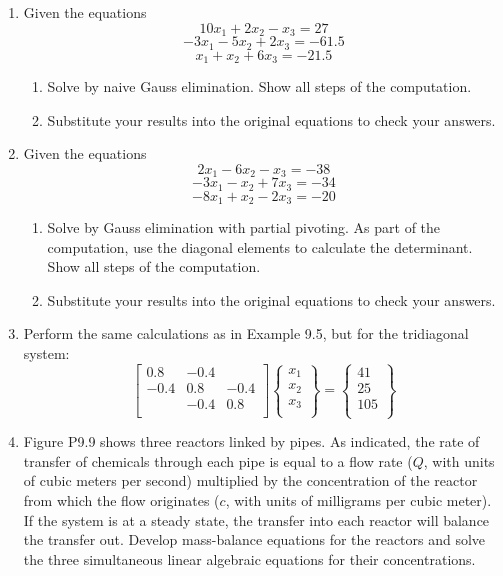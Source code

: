 \documentclass[../main.tex]{subfiles}
\begin{document}
\begin{multicols}{2}
\begin{enumerate}
	\item Given the equations
		$$10x_{1}+2x_{2}-x_{3}=27$$
		$$-3x_{1}-5x_{2}+2x_{3}=-61.5$$
		$$x_{1}+x_{2}+6x_{3}=-21.5$$
		\begin{enumerate}
			\item Solve by naive Gauss elimination. Show all steps of the computation.
			\item Substitute your results into the original equations to check your answers.
		\end{enumerate}
	\item Given the equations
		$$2x_{1}-6x_{2}-x_{3}=-38$$
		$$-3x_{1}-x_{2}+7x_{3}=-34$$
		$$-8x_{1}+x_{2}-2x_{3}=-20$$
		\begin{enumerate}
			\item Solve by Gauss elimination with partial pivoting. As part of the computation, use the diagonal elements to calculate the determinant. Show all steps of the computation.
			\item Substitute your results into the original equations to check your answers.
		\end{enumerate}
	\item Perform the same calculations as in Example 9.5, but for the tridiagonal system:
\begin{equation}
\left [\begin{array}{ccccc}
0.8 	& -0.4 	& 	 	\\
-0.4	& 0.8	& -0.4 	\\
 		& -0.4 	& 0.8	\\
\end{array} \right ]
\begin{Bmatrix}
x_{1}\\
x_{2}\\
x_{3}\\
\end{Bmatrix} =
\begin{Bmatrix}
41\\
25\\
105\\
\end{Bmatrix}
\end{equation}
	\item Figure P9.9 shows three reactors linked by pipes. As indicated, the rate of transfer of chemicals through each pipe is equal to a flow rate ($Q$, with units of cubic meters per second) multiplied by the concentration of the reactor from which the flow originates ($c$, with units of milligrams per cubic meter). If the system is at a steady state, the transfer into each reactor will balance the transfer out. Develop mass-balance equations for the reactors and solve the three simultaneous linear algebraic equations for their concentrations.

\end{enumerate}
\end{multicols}
\end{document}

